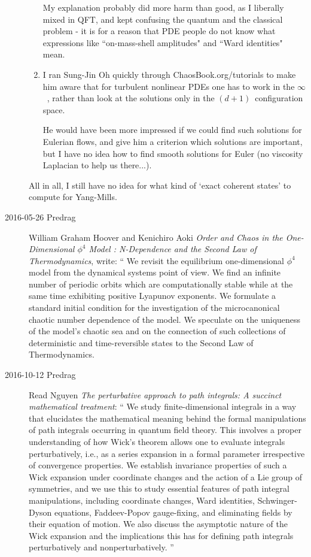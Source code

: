 \begin{description}
\begin{enumerate}
My explanation probably did more harm than good, as I liberally mixed in
QFT, and kept confusing the quantum and the classical problem - it is for
a reason that PDE people do not know what expressions like
``on-mass-shell amplitudes" and ``Ward identities" mean.

  \item
I ran Sung-Jin Oh quickly through 
{ChaosBook.org/tutorials} to make him aware that for turbulent nonlinear
PDEs one has to work in the $\infty$\dmn\ \statesp, rather than look at
the solutions only in the $(d+1)$\dmn\ configuration space.

He would have been more impressed if we could find such solutions for
Eulerian flows, and give him a criterion which solutions are important,
but I have no idea how to find smooth solutions for Euler (no viscosity
Laplacian to help us there...).

\end{enumerate}

All in all, I still have no idea for what kind of `exact coherent states'
to compute for Yang-Mills.

\item[2016-05-26 Predrag]
William Graham Hoover and Kenichiro Aoki
{\em Order and Chaos in the One-Dimensional $\phi^4$ Model : N-Dependence and
  the Second Law of Thermodynamics},  write: ``
  We revisit the equilibrium one-dimensional $\phi^4$ model from the dynamical
systems point of view. We find an infinite number of periodic orbits which are
computationally stable while at the same time exhibiting positive Lyapunov
exponents. We formulate a standard initial condition for the investigation of
the microcanonical chaotic number dependence of the model. We speculate on the
uniqueness of the model's chaotic sea and on the connection of such collections
of deterministic and time-reversible states to the Second Law of
Thermodynamics.

\item[2016-10-12 Predrag]
Read Nguyen
{\em The perturbative approach to path integrals:
{A} succinct mathematical treatment}: ``
We study finite-dimensional integrals in a way that elucidates the
mathematical meaning behind the formal manipulations of path integrals
occurring in quantum field theory. This involves a proper understanding
of how Wick's theorem allows one to evaluate integrals perturbatively,
i.e., as a series expansion in a formal parameter irrespective of
convergence properties. We establish invariance properties of such a Wick
expansion under coordinate changes and the action of a Lie group of
symmetries, and we use this to study essential features of path integral
manipulations, including coordinate changes, Ward identities,
Schwinger-Dyson equations, Faddeev-Popov gauge-fixing, and eliminating
fields by their equation of motion. We also discuss the asymptotic nature
of the Wick expansion and the implications this has for defining path
integrals perturbatively and nonperturbatively.
''


\end{description}
